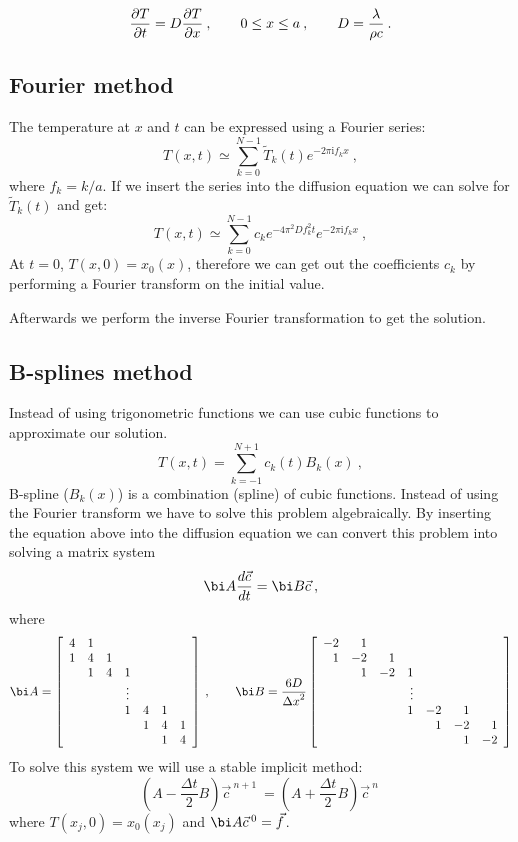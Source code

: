 \documentclass[12pt, a4paper]{article}
\begin{document}
\begin{equation*}
  \frac{\partial T}{\partial t} = D\frac{\partial T}{\partial x} \>, \qquad 0\le x \le a \>, \qquad D={\lambda\over \rho c} \>.
\end{equation*}

\subsection{Fourier method}
The temperature at $x$ and $t$ can be expressed using a Fourier series:
\begin{equation*}
  T(x,t) \simeq \sum_{k=0}^{N-1} \widetilde{T}_k(t)
  e^{-2\pi\mathrm{i} f_k x} \>,
\end{equation*}
where $f_k = k/a$. If we insert the series into the diffusion equation we can solve for $\widetilde{T}_k(t)$ and get:
\begin{equation*}
  T(x,t) \simeq \sum_{k=0}^{N-1} c_k e^{-4\pi^2Df_k^2t}
  e^{-2\pi\mathrm{i} f_k x} \>,
\end{equation*}
At $t=0$, $T(x,0) = x_0(x)$, therefore we can get out the coefficients $c_k$ by performing a Fourier transform on the initial value. 

Afterwards we perform the inverse Fourier transformation to get the solution.

\subsection{B-splines method}
Instead of using trigonometric functions we can use cubic functions to approximate our solution. 
\begin{equation*}
  T(x,t) = \sum_{k=-1}^{N+1} c_k(t) B_k(x) \>,
\end{equation*}
B-spline ($B_k(x)$) is a combination (spline) of cubic functions. Instead of using the Fourier transform we have to solve this problem algebraically. By inserting the equation above into the diffusion equation we can convert this problem into solving a matrix system
\begin{equation*}
  {\bi A}\frac{d\vec{c}}{dt} = {\bi B}\vec{c} \>,
\end{equation*}
where
\begin{equation*}
  {\bi A} = \left[
\begin{array}{ccccccc}
4 & 1 \cr
1 & 4 & 1 \cr
  & 1 & 4 & 1 \cr
  &   &   & \vdots \cr
  &   &   & 1 & 4 & 1 & \cr
  &   &   &   & 1 & 4 & 1 \cr
  &   &   &   &   & 1 & 4
\end{array}
\right] \>, \qquad
{\bi B} = {6D\over{\Delta x}^2} \left[
\begin{array}{rrrrrrr}
-2 & 1 \cr
1 & -2 & 1 \cr
  & 1 & -2 & 1 \cr
  &   &   & \vdots \cr
  &   &   & 1 & -2 & 1 & \cr
  &   &   &   & 1 & -2 & 1 \cr
  &   &   &   &   & 1 & -2
\end{array}
\right]
\end{equation*}
To solve this system we will use a stable implicit method:
\begin{equation*}
  \left( { A} - \frac{\Delta t}{2}{ B}\right)\vec{c}^{\>n+1} \>
  = \left( { A} + \frac{\Delta t}{2}{ B}\right)\vec{c}^{\>n} \>
\end{equation*}
where $T(x_j,0) = x_0(x_j)$ and ${\bi A}\vec{c}^{\>0} = \vec{f}$.
\end{document}
